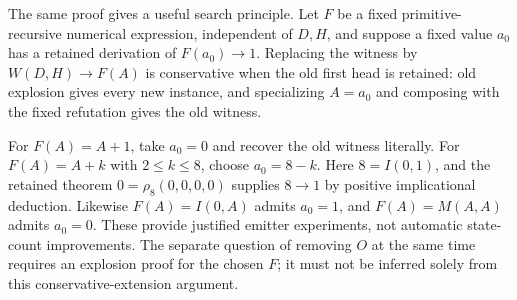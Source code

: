 The same proof gives a useful search principle.  Let $F$ be a fixed
primitive-recursive numerical expression, independent of $D,H$, and
suppose a fixed value $a_0$ has a retained derivation of
$F(a_0)\to1$.  Replacing the witness by $W(D,H)\to F(A)$ is
conservative when the old first head is retained: old explosion gives
every new instance, and specializing $A=a_0$ and composing with the
fixed refutation gives the old witness.

For $F(A)=A+1$, take $a_0=0$ and recover the old witness literally.
For $F(A)=A+k$ with $2\leq k\leq8$, choose $a_0=8-k$.
Here $8=I(0,1)$, and the retained theorem $0=\rho_8(0,0,0,0)$ supplies
$8\to1$ by positive implicational deduction.  Likewise
$F(A)=I(0,A)$ admits $a_0=1$, and $F(A)=M(A,A)$ admits $a_0=0$.
These provide justified emitter experiments, not automatic state-count
improvements.  The separate question of removing $O$ at the same time
requires an explosion proof for the chosen $F$; it must not be inferred
solely from this conservative-extension argument.
